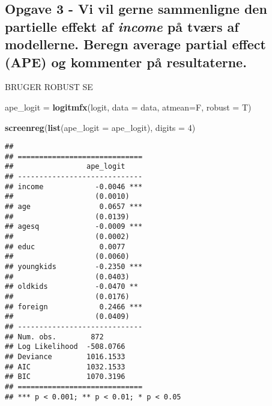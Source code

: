 \documentclass[
]{article}
\newenvironment{Shaded}{\begin{snugshade}}{\end{snugshade}}
\newcommand{\AttributeTok}[1]{\textcolor[rgb]{0.13,0.29,0.53}{#1}}
\newcommand{\DecValTok}[1]{\textcolor[rgb]{0.00,0.00,0.81}{#1}}
\newcommand{\FunctionTok}[1]{\textcolor[rgb]{0.13,0.29,0.53}{\textbf{#1}}}
\newcommand{\NormalTok}[1]{#1}
\newcommand{\OtherTok}[1]{\textcolor[rgb]{0.56,0.35,0.01}{#1}}
\begin{document}
\hypertarget{opgave-3---vi-vil-gerne-sammenligne-den-partielle-effekt-af-puxe5-tvuxe6rs-af-modellerne.-beregn-average-partial-effect-ape-og-kommenter-puxe5-resultaterne.}{%
\subsection{\texorpdfstring{Opgave 3 - Vi vil gerne sammenligne den
partielle effekt af \textit{income} på tværs af modellerne. Beregn
average partial effect (APE) og kommenter på
resultaterne.}{Opgave 3 - Vi vil gerne sammenligne den partielle effekt af  på tværs af modellerne. Beregn average partial effect (APE) og kommenter på resultaterne.}}\label{opgave-3---vi-vil-gerne-sammenligne-den-partielle-effekt-af-puxe5-tvuxe6rs-af-modellerne.-beregn-average-partial-effect-ape-og-kommenter-puxe5-resultaterne.}}

BRUGER ROBUST SE

\begin{Shaded}
\begin{Highlighting}[]
\NormalTok{ape\_logit }\OtherTok{=} \FunctionTok{logitmfx}\NormalTok{(logit, }\AttributeTok{data =}\NormalTok{ data, }\AttributeTok{atmean=}\NormalTok{F, }\AttributeTok{robust =}\NormalTok{ T)}

\FunctionTok{screenreg}\NormalTok{(}\FunctionTok{list}\NormalTok{(}\AttributeTok{ape\_logit =}\NormalTok{ ape\_logit), }\AttributeTok{digits =} \DecValTok{4}\NormalTok{)}
\end{Highlighting}
\end{Shaded}

\begin{verbatim}
## 
## =============================
##                 ape_logit    
## -----------------------------
## income            -0.0046 ***
##                   (0.0010)   
## age                0.0657 ***
##                   (0.0139)   
## agesq             -0.0009 ***
##                   (0.0002)   
## educ               0.0077    
##                   (0.0060)   
## youngkids         -0.2350 ***
##                   (0.0403)   
## oldkids           -0.0470 ** 
##                   (0.0176)   
## foreign            0.2466 ***
##                   (0.0409)   
## -----------------------------
## Num. obs.        872         
## Log Likelihood  -508.0766    
## Deviance        1016.1533    
## AIC             1032.1533    
## BIC             1070.3196    
## =============================
## *** p < 0.001; ** p < 0.01; * p < 0.05
\end{verbatim}
\end{document}
